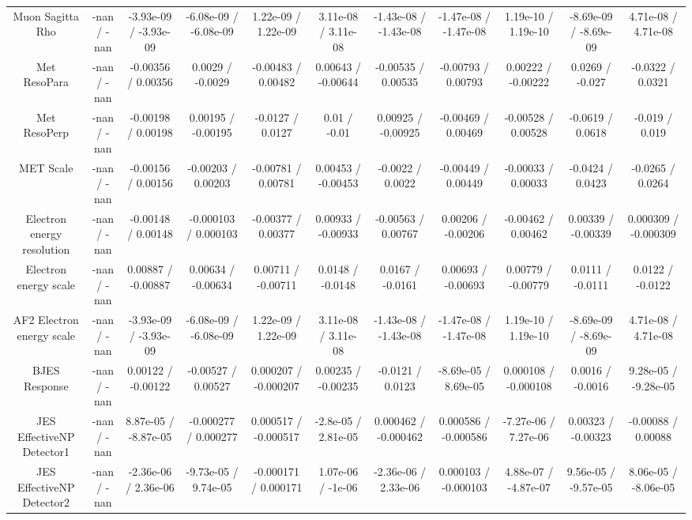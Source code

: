 \begin{table}[htbp]
\begin{center}
\begin{tabular}{|c|c|c|c|c|c|c|c|c|c|c|}
  Muon Sagitta Rho & -nan / -nan & -3.93e-09 / -3.93e-09 & -6.08e-09 / -6.08e-09 & 1.22e-09 / 1.22e-09 & 3.11e-08 / 3.11e-08 & -1.43e-08 / -1.43e-08 & -1.47e-08 / -1.47e-08 & 1.19e-10 / 1.19e-10 & -8.69e-09 / -8.69e-09 & 4.71e-08 / 4.71e-08 \\ 
  Met ResoPara & -nan / -nan & -0.00356 / 0.00356 & 0.0029 / -0.0029 & -0.00483 / 0.00482 & 0.00643 / -0.00644 & -0.00535 / 0.00535 & -0.00793 / 0.00793 & 0.00222 / -0.00222 & 0.0269 / -0.027 & -0.0322 / 0.0321 \\ 
  Met ResoPerp & -nan / -nan & -0.00198 / 0.00198 & 0.00195 / -0.00195 & -0.0127 / 0.0127 & 0.01 / -0.01 & 0.00925 / -0.00925 & -0.00469 / 0.00469 & -0.00528 / 0.00528 & -0.0619 / 0.0618 & -0.019 / 0.019 \\ 
  MET Scale & -nan / -nan & -0.00156 / 0.00156 & -0.00203 / 0.00203 & -0.00781 / 0.00781 & 0.00453 / -0.00453 & -0.0022 / 0.0022 & -0.00449 / 0.00449 & -0.00033 / 0.00033 & -0.0424 / 0.0423 & -0.0265 / 0.0264 \\ 
  Electron energy resolution & -nan / -nan & -0.00148 / 0.00148 & -0.000103 / 0.000103 & -0.00377 / 0.00377 & 0.00933 / -0.00933 & -0.00563 / 0.00767 & 0.00206 / -0.00206 & -0.00462 / 0.00462 & 0.00339 / -0.00339 & 0.000309 / -0.000309 \\ 
  Electron energy scale & -nan / -nan & 0.00887 / -0.00887 & 0.00634 / -0.00634 & 0.00711 / -0.00711 & 0.0148 / -0.0148 & 0.0167 / -0.0161 & 0.00693 / -0.00693 & 0.00779 / -0.00779 & 0.0111 / -0.0111 & 0.0122 / -0.0122 \\ 
  AF2 Electron energy scale & -nan / -nan & -3.93e-09 / -3.93e-09 & -6.08e-09 / -6.08e-09 & 1.22e-09 / 1.22e-09 & 3.11e-08 / 3.11e-08 & -1.43e-08 / -1.43e-08 & -1.47e-08 / -1.47e-08 & 1.19e-10 / 1.19e-10 & -8.69e-09 / -8.69e-09 & 4.71e-08 / 4.71e-08 \\ 
  BJES Response & -nan / -nan & 0.00122 / -0.00122 & -0.00527 / 0.00527 & 0.000207 / -0.000207 & 0.00235 / -0.00235 & -0.0121 / 0.0123 & -8.69e-05 / 8.69e-05 & 0.000108 / -0.000108 & 0.0016 / -0.0016 & 9.28e-05 / -9.28e-05 \\ 
  JES EffectiveNP Detector1 & -nan / -nan & 8.87e-05 / -8.87e-05 & -0.000277 / 0.000277 & 0.000517 / -0.000517 & -2.8e-05 / 2.81e-05 & 0.000462 / -0.000462 & 0.000586 / -0.000586 & -7.27e-06 / 7.27e-06 & 0.00323 / -0.00323 & -0.00088 / 0.00088 \\ 
  JES EffectiveNP Detector2 & -nan / -nan & -2.36e-06 / 2.36e-06 & -9.73e-05 / 9.74e-05 & -0.000171 / 0.000171 & 1.07e-06 / -1e-06 & -2.36e-06 / 2.33e-06 & 0.000103 / -0.000103 & 4.88e-07 / -4.87e-07 & 9.56e-05 / -9.57e-05 & 8.06e-05 / -8.06e-05 \\ 

\end{tabular}
\end{center}
\end{table}
